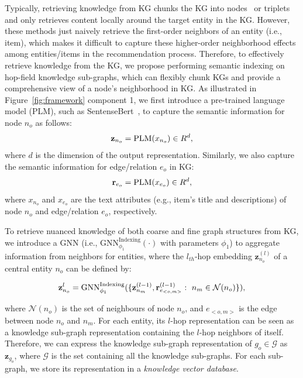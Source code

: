 Typically, retrieving knowledge from KG chunks the KG into nodes~\citep{he2024g} or triplets~\citep{luo2023reasoning} and only retrieves content locally around the target entity in the KG.
However, these methods just naively retrieve the first-order neighbors of an entity (i.e., item), which makes it difficult to capture these higher-order neighborhood effects among entities/items in the recommendation process. 
Therefore, to effectively retrieve knowledge from the KG, we propose performing semantic indexing on hop-field knowledge sub-graphs, which can flexibly chunk KGs and provide a comprehensive view of a node's neighborhood in KG.
As illustrated in Figure~\ref{fig:framework} component 1, we first introduce a pre-trained language model (PLM), such as SentenseBert~\citep{reimers2019sentence},  to capture the semantic information for node $n_o$ as follows:
\begin{equation}
\setlength{\abovedisplayskip}{3pt}
\setlength{\belowdisplayskip}{3pt}
\textbf{z}_{n_o}=\text{PLM}(x_{n_o})\in {R}^d,
\end{equation}
where $d$ is the dimension of the output representation. Similarly, we also capture the semantic information for edge/relation $e_o$ in KG:
\begin{equation}
\setlength{\abovedisplayskip}{3pt}
\setlength{\belowdisplayskip}{3pt}
\textbf{r}_{e_o}=\text{PLM}(x_{e_o})\in {R}^d,
\end{equation}
where $x_{n_o}$ and $x_{e_o}$ are the text attributes (e.g., item's title and descriptions) of node $n_o$ and edge/relation $e_o$, respectively.

To retrieve nuanced knowledge of both coarse and fine graph structures from KG, we introduce a GNN (i.e., $\text{GNN}_{\phi_1}^{\text{Indexing}} (\cdot)$ with parameters $\phi_1$) to aggregate information from neighbors for entities, where the $l_{th}$-hop embedding $\textbf{z}_{n_o}^{(l)}$ of a central entity $n_o$ can be defined by:
\begin{small}
\begin{equation}
\setlength{\abovedisplayskip}{3pt}
\setlength{\belowdisplayskip}{3pt}
\textbf{z}_{n_o}^{l} = \text{GNN}_{\phi_1}^{\text{Indexing}} (\{\textbf{z}_{n_m}^{(l-1)}, \textbf{r}_{e_{<o, m>}}^{(l-1)}: \\
~ n_m \in \mathcal{N}(n_o)   \}),
\end{equation}
\end{small}
where $\mathcal{N}(n_o)$ is the set of neighbours of node $n_o$, 
and $e_{<o, m>}$ is the edge between node $n_o$ and $n_m$.
For each entity, its $l$-hop representation can be seen as a knowledge sub-graph representation containing the $l$-hop neighbors of itself. 
Therefore, we can express the knowledge sub-graph representation of $g_o \in \mathcal{G}$ as $\textbf{z}_{g_o}$, where $\mathcal{G}$ is the set containing all the knowledge sub-graphs. For each sub-graph, we store its representation in a \emph{knowledge vector database}. 






